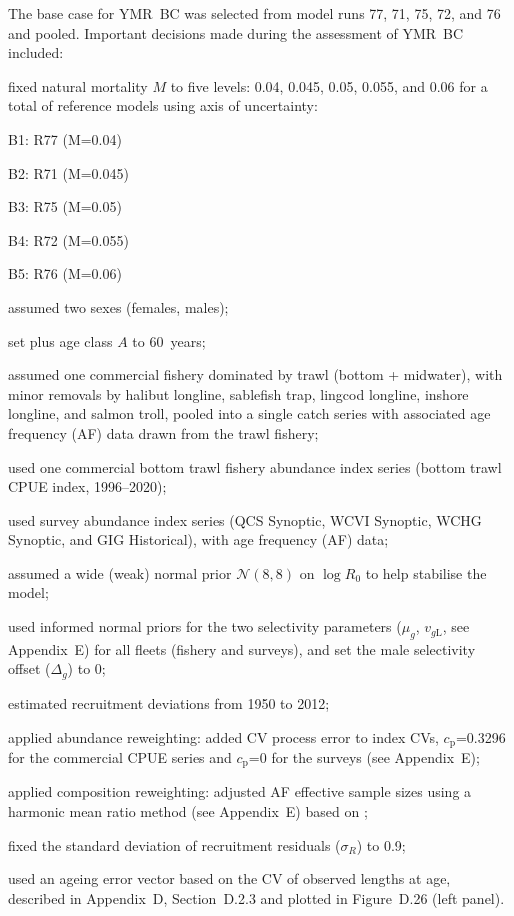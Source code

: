 \documentclass[11pt]{book}
\newcommand{\AppBio}{Appendix~D}
\newcommand{\AppEqn}{Appendix~E}
\begin{document}
The base case for YMR~BC was selected from model runs 77, 71, 75, 72, and 76 and pooled.
Important decisions made during the assessment of YMR~BC included:
\vspace{-0.5\baselineskip}%
\begin{itemize_csas}
  \item fixed natural mortality $M$ to five levels: 0.04, 0.045, 0.05, 0.055, and 0.06 for a total of  reference models using  axis of uncertainty:
  \begin{itemize_csas}
    \item B1: R77 (M=0.04)\\\item B2: R71 (M=0.045)\\\item B3: R75 (M=0.05)\\\item B4: R72 (M=0.055)\\\item B5: R76 (M=0.06)  %
  \end{itemize_csas}
  \item assumed two sexes (females, males);
  \item set plus age class $A$ to 60~years;
  \item assumed one commercial fishery dominated by trawl (bottom + midwater), with minor removals by halibut longline, sablefish trap, lingcod longline, inshore longline, and salmon troll, pooled into a single catch series with associated age frequency (AF) data drawn from the trawl fishery;
  \item used one commercial bottom trawl fishery abundance index series (bottom trawl CPUE index, 1996--2020);
  \item used  survey abundance index series (QCS Synoptic, WCVI Synoptic, WCHG Synoptic, and GIG Historical), with age frequency (AF) data;
  \item assumed a wide (weak) normal prior $\mathcal{N}(8,8)$ on $\log R_0$ to help stabilise the model; 
  \item used informed normal priors for the two selectivity parameters ($\mu_g$, $v_{g\mathrm{L}}$, see \AppEqn) for all fleets (fishery and surveys), and set the male selectivity offset ($\Delta_{g}$) to 0;
  \item estimated recruitment deviations from 1950 to 2012;
  \item applied abundance reweighting: added CV process error to index CVs, $c_\mathrm{p}$=0.3296 for the commercial CPUE series and $c_\mathrm{p}$=0 for the surveys (see \AppEqn);
  \item applied composition reweighting: adjusted AF effective sample sizes using a harmonic mean ratio method (see \AppEqn) based on \citet{McAllister-Ianelli:1997};
  \item fixed the standard deviation of recruitment residuals ($\sigma_R$) to 0.9;
  \item used an ageing error vector based on the CV of observed lengths at age, described in \AppBio, Section~D.2.3 and plotted in Figure~D.26 (left panel).
\end{itemize_csas}
\end{document}
